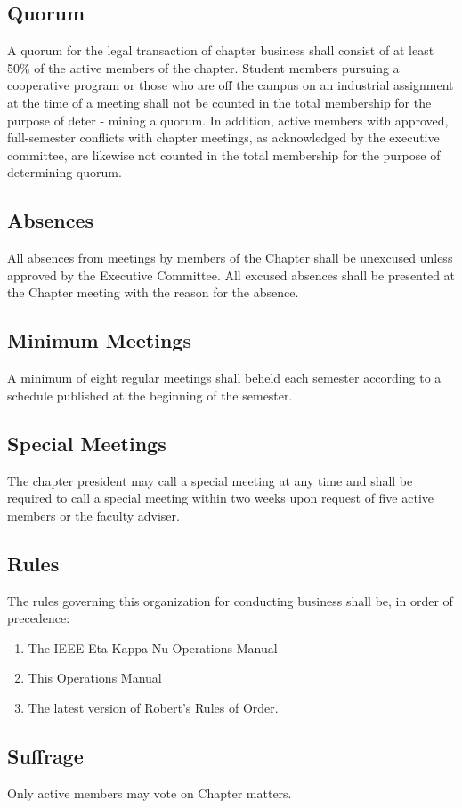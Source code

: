 \documentclass[10pt, oneside]{article}
\begin{document}
\subsection{Quorum}
A quorum for the legal transaction of chapter business shall consist of at least 50\% of the active members of the chapter. Student members pursuing a cooperative program or those who are off the campus on an industrial assignment at the time of a meeting shall not be counted in the total membership for the purpose of deter - mining a quorum. In addition, active members with approved, full-semester conflicts with chapter meetings, as acknowledged by the executive committee, are likewise not counted in the total membership for the purpose of determining quorum.
\subsection{Absences}
All absences from meetings by members of the Chapter shall be unexcused unless approved by the Executive Committee. All excused absences shall be presented at the Chapter meeting with the reason for the absence.
\subsection{Minimum Meetings}
A minimum of eight regular meetings shall beheld each semester according to a schedule published at the beginning of the semester.
\subsection{Special Meetings}
The chapter president may call a special meeting at any time and shall be required to call a special meeting within two weeks upon request of five active members or the faculty adviser.
\subsection{Rules}
The rules governing this organization for conducting business shall be, in order of precedence:
\begin{enumerate}[label=\alph*.]
\item The IEEE-Eta Kappa Nu Operations Manual
\item This Operations Manual
\item The latest version of Robert’s Rules of Order.
\end{enumerate}
\subsection{Suffrage}
Only active members may vote on Chapter matters.
\end{document}
